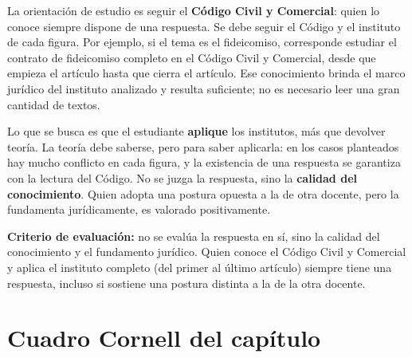 \documentclass[12pt,oneside]{book}
\begin{document}
La orientación de estudio es seguir el \textbf{Código Civil y Comercial}: quien lo conoce siempre dispone de una respuesta. Se debe seguir el Código y el instituto de cada figura. Por ejemplo, si el tema es el fideicomiso, corresponde estudiar el contrato de fideicomiso completo en el Código Civil y Comercial, desde que empieza el artículo hasta que cierra el artículo. Ese conocimiento brinda el marco jurídico del instituto analizado y resulta suficiente; no es necesario leer una gran cantidad de textos.

Lo que se busca es que el estudiante \textbf{aplique} los institutos, más que devolver teoría. La teoría debe saberse, pero para saber aplicarla: en los casos planteados hay mucho conflicto en cada figura, y la existencia de una respuesta se garantiza con la lectura del Código. No se juzga la respuesta, sino la \textbf{calidad del conocimiento}. Quien adopta una postura opuesta a la de otra docente, pero la fundamenta jurídicamente, es valorado positivamente.

\begin{important}
\textbf{Criterio de evaluación:} no se evalúa la respuesta en sí, sino la calidad del conocimiento y el fundamento jurídico. Quien conoce el Código Civil y Comercial y aplica el instituto completo (del primer al último artículo) siempre tiene una respuesta, incluso si sostiene una postura distinta a la de la otra docente.
\end{important}

\section{Cuadro Cornell del capítulo}
\end{document}

